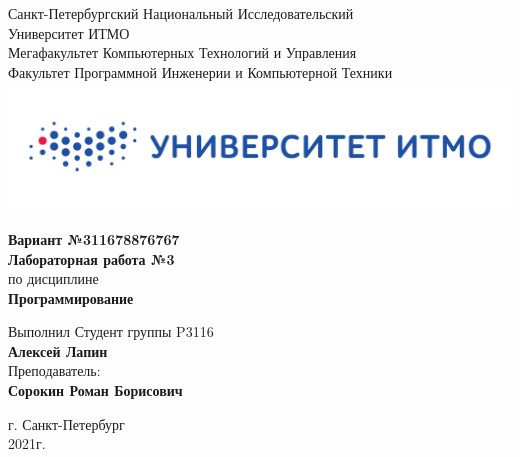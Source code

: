 \documentclass[12pt,onecolumn]{article}
\begin{document}
\setcounter{tocdepth}{4}
\begin{center}
    Санкт-Петербургский Национальный Исследовательский\\ 
    Университет ИТМО\\
    Мегафакультет Компьютерных Технологий и Управления\\
    Факультет Программной Инженерии и Компьютерной Техники \\
    \includegraphics[scale=0.3]{itm.jpg} %
\end{center}
\vspace{1cm}


\begin{center}
    \large \textbf{Вариант №311678876767}\\
    \textbf{Лабораторная работа №3}\\
    по дисциплине\\
    \textbf{Программирование}
\end{center}

\vspace{2cm}

\begin{flushright}
  Выполнил Студент  группы P3116\\
  \textbf{Алексей Лапин}\\
  Преподаватель: \\
  \textbf{Сорокин Роман Борисович}\\
\end{flushright}

\vspace{10cm}
\begin{center}
    г. Санкт-Петербург\\
    2021г.
\end{center}
\newpage
\tableofcontents
\newpage
\end{document}

